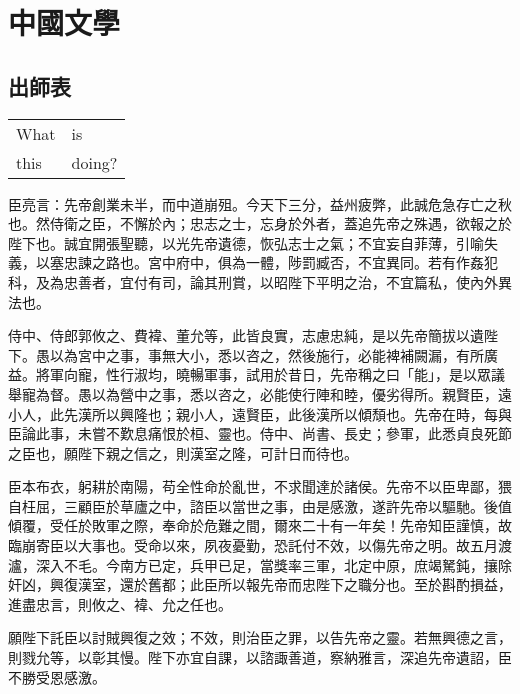 
\chapter{中國文學}

\section{出師表}

\begingroup
\centering

\begin{tabular}{ll}
    What & is     \\
    this & doing? \\
\end{tabular}
\captionsetup{type=table}
\label{tbl:nicetablelesstable}
\endgroup

臣亮言：先帝創業未半，而中道崩殂。今天下三分，益州疲弊，此誠危急存亡之秋也。然侍衛之臣，不懈於內；忠志之士，忘身於外者，蓋追先帝之殊遇，欲報之於陛下也。誠宜開張聖聽，以光先帝遺德，恢弘志士之氣；不宜妄自菲薄，引喻失義，以塞忠諫之路也。宮中府中，俱為一體，陟罰臧否，不宜異同。若有作姦犯科，及為忠善者，宜付有司，論其刑賞，以昭陛下平明之治，不宜篇私，使內外異法也。\par

侍中、侍郎郭攸之、費褘、董允等，此皆良實，志慮忠純，是以先帝簡拔以遺陛下。愚以為宮中之事，事無大小，悉以咨之，然後施行，必能裨補闕漏，有所廣益。將軍向寵，性行淑均，曉暢軍事，試用於昔日，先帝稱之曰「能」，是以眾議舉寵為督。愚以為營中之事，悉以咨之，必能使行陣和睦，優劣得所。親賢臣，遠小人，此先漢所以興隆也；親小人，遠賢臣，此後漢所以傾頹也。先帝在時，每與臣論此事，未嘗不歎息痛恨於桓、靈也。侍中、尚書、長史；參軍，此悉貞良死節之臣也，願陛下親之信之，則漢室之隆，可計日而待也。

臣本布衣，躬耕於南陽，苟全性命於亂世，不求聞達於諸侯。先帝不以臣卑鄙，猥自枉屈，三顧臣於草廬之中，諮臣以當世之事，由是感激，遂許先帝以驅馳。後值傾覆，受任於敗軍之際，奉命於危難之間，爾來二十有一年矣！先帝知臣謹慎，故臨崩寄臣以大事也。受命以來，夙夜憂勤，恐託付不效，以傷先帝之明。故五月渡瀘，深入不毛。今南方已定，兵甲已足，當獎率三軍，北定中原，庶竭駑鈍，攘除奸凶，興復漢室，還於舊都；此臣所以報先帝而忠陛下之職分也。至於斟酌損益，進盡忠言，則攸之、褘、允之任也。

願陛下託臣以討賊興復之效；不效，則治臣之罪，以告先帝之靈。若無興德之言，則戮允等，以彰其慢。陛下亦宜自課，以諮諏善道，察納雅言，深追先帝遺詔，臣不勝受恩感激。

